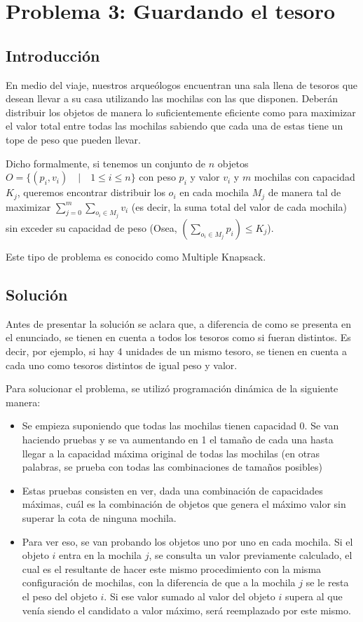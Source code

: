 \section{Problema 3: Guardando el tesoro}

\subsection{Introducción}

En medio del viaje, nuestros arqueólogos encuentran una sala llena de tesoros que desean llevar a su casa utilizando las mochilas con las que disponen. Deberán distribuir los objetos de manera lo suficientemente eficiente como para maximizar el valor total entre todas las mochilas sabiendo que cada una de estas tiene un tope de peso que pueden llevar.

Dicho formalmente, si tenemos un conjunto de $n$ objetos $O = \{(p_i,v_i) \quad | \quad 1 \leq i \leq n\}$ con peso $p_i$ y valor $v_i$ y $m$ mochilas con capacidad $K_j$, queremos encontrar distribuir los $o_i$ en cada mochila $M_j$ de manera tal de maximizar $\sum_{j = 0}^m\sum_{o_i \in M_j} v_i$ (es decir, la suma total del valor de cada mochila) sin exceder su capacidad de peso (Osea, $(\sum_{o_i \in M_j} p_i) \leq K_j$).

Este tipo de problema es conocido como Multiple Knapsack.

\subsection{Solución}

Antes de presentar la solución se aclara que, a diferencia de como se presenta en el enunciado, se tienen en cuenta a todos los tesoros como si fueran distintos. Es decir, por ejemplo, si hay 4 unidades de un mismo tesoro, se tienen en cuenta a cada uno como tesoros distintos de igual peso y valor.

Para solucionar el problema, se utilizó programación dinámica de la siguiente manera:

\begin{itemize}
\item Se empieza suponiendo que todas las mochilas tienen capacidad 0. Se van haciendo pruebas y se va aumentando en 1 el tamaño de cada una hasta llegar a la capacidad máxima original de todas las mochilas (en otras palabras, se prueba con todas las combinaciones de tamaños posibles)
\item Estas pruebas consisten en ver, dada una combinación de capacidades máximas, cuál es la combinación de objetos que genera el máximo valor sin superar la cota de ninguna mochila.
\item Para ver eso, se van probando los objetos uno por uno en cada mochila. Si el objeto $i$ entra en la mochila $j$, se consulta un valor previamente calculado, el cual es el resultante de hacer este mismo procedimiento con la misma configuración de mochilas, con la diferencia de que a la mochila $j$ se le resta el peso del objeto $i$. Si ese valor sumado al valor del objeto $i$ supera al que venía siendo el candidato a valor máximo, será reemplazado por este mismo.
\end{itemize}

